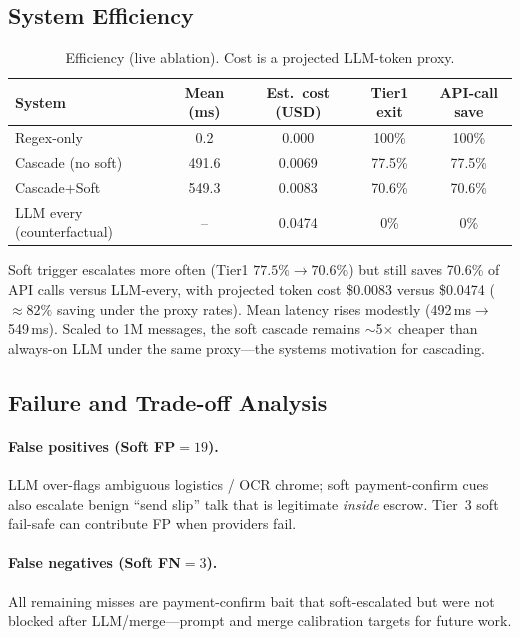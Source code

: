 \documentclass[conference]{IEEEtran}
\begin{document}
\subsection{System Efficiency}
\begin{table}[t]
\centering
\caption{Efficiency (live ablation). Cost is a projected LLM-token proxy.}
\label{tab:ablation-efficiency}
\begin{tabular}{lcccc}
\toprule
System & Mean (ms) & Est.\ cost (USD) & Tier1 exit & API-call save \\
\midrule
Regex-only & 0.2 & 0.000 & 100\% & 100\% \\
Cascade (no soft) & 491.6 & 0.0069 & 77.5\% & 77.5\% \\
Cascade+Soft & 549.3 & 0.0083 & 70.6\% & 70.6\% \\
LLM every (counterfactual) & -- & 0.0474 & 0\% & 0\% \\
\bottomrule
\end{tabular}
\end{table}

Soft trigger escalates more often (Tier1 $77.5\%\!\rightarrow\!70.6\%$) but still
saves 70.6\% of API calls versus LLM-every, with projected token cost
\$0.0083 versus \$0.0474 (${\approx}82\%$ saving under the proxy rates). Mean
latency rises modestly (492\,ms$\rightarrow$549\,ms). Scaled to 1M messages,
the soft cascade remains ${\sim}$5$\times$ cheaper than always-on LLM under the
same proxy---the systems motivation for cascading.

\subsection{Failure and Trade-off Analysis}
\paragraph{False positives (Soft FP$=19$).}
LLM over-flags ambiguous logistics / OCR chrome; soft payment-confirm cues also
escalate benign ``send slip'' talk that is legitimate \emph{inside} escrow.
Tier~3 soft fail-safe can contribute FP when providers fail.

\paragraph{False negatives (Soft FN$=3$).}
All remaining misses are payment-confirm bait that soft-escalated but were not
blocked after LLM/merge---prompt and merge calibration targets for future work.
\end{document}
